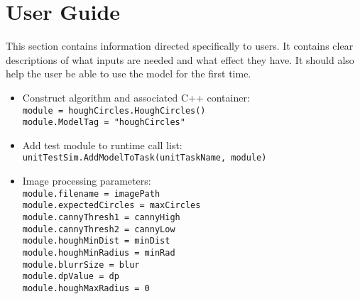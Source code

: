 
\section{User Guide}
This section contains information directed specifically to users. It contains clear descriptions of what inputs are needed and what effect they have. It should also help the user be able to use the model for the first time.

\begin{itemize}
\item Construct algorithm and associated C++ container:\\
\texttt{module = houghCircles.HoughCircles()}\\
\texttt{module.ModelTag = "houghCircles"}\\
\item Add test module to runtime call list: \\
\texttt{unitTestSim.AddModelToTask(unitTaskName, module)}\\
\item Image processing parameters: \\
\texttt{module.filename = imagePath}\\
\texttt{module.expectedCircles = maxCircles}\\
\texttt{module.cannyThresh1 = cannyHigh}\\
\texttt{module.cannyThresh2 = cannyLow}\\
\texttt{module.houghMinDist = minDist}\\
\texttt{module.houghMinRadius = minRad}\\
\texttt{module.blurrSize = blur}\\
\texttt{module.dpValue = dp}\\
\texttt{module.houghMaxRadius = 0}
\end{itemize}